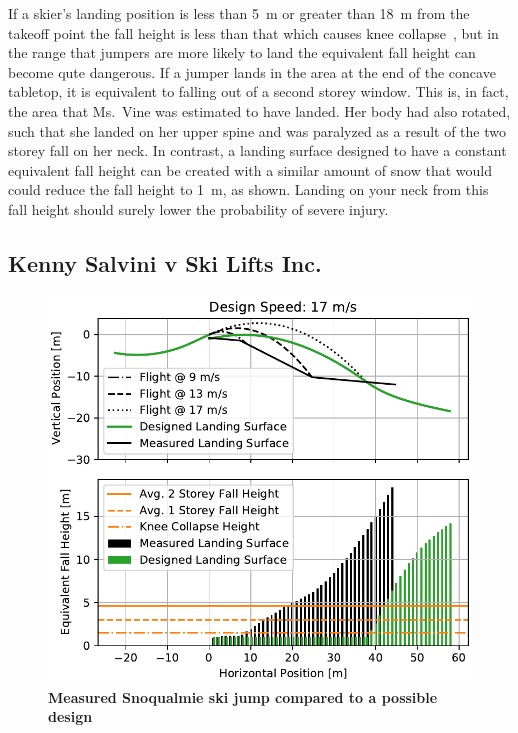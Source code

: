 \documentclass{article}
\begin{document}
If a skier's landing position is less than 5~\si{\meter} or greater than
18~\si{\meter} from the takeoff point the fall height is less than that which
causes knee collapse~\cite{Minetti1998}, but in the range that jumpers are more
likely to land the equivalent fall height can become qute dangerous. If a
jumper lands in the area at the end of the concave tabletop, it is equivalent
to falling out of a second storey window. This is, in fact, the area that
Ms.~Vine was estimated to have landed. Her body had also rotated, such that she
landed on her upper spine and was paralyzed as a result of the two storey fall
on her neck. In contrast, a landing surface designed to have a constant
equivalent fall height can be created with a similar amount of snow that would
could reduce the fall height to 1~\si{\meter}, as shown. Landing on your neck
from this fall height should surely lower the probability of severe injury.

\subsection{Kenny Salvini v Ski Lifts Inc.}
%
\begin{figure}
  \centering
  \includegraphics[width=5.25in]{figures/salvini-v-snoqualmie.pdf}
  \caption{\textbf{Measured Snoqualmie ski jump compared to a possible design}}
  \label{fig:salvini-v-snoqualmie}
\end{figure}
\end{document}

